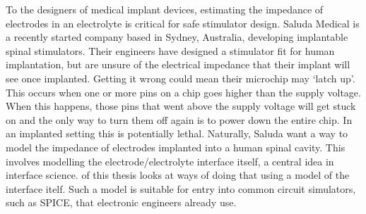   To the designers of medical implant devices, estimating the impedance of electrodes in an electrolyte is critical for safe stimulator design.
  Saluda Medical is a recently started company based in Sydney, Australia, developing implantable spinal stimulators.
  Their engineers have designed a stimulator fit for human implantation, but are unsure of the electrical impedance that their implant will see once implanted.
  Getting it wrong could mean their microchip may `latch up'.
  This occurs when one or more pins on a chip goes higher than the supply voltage.
  When this happens, those pins that went above the supply voltage will get stuck on and the only way to turn them off again is to power down the entire chip.
  In an implanted setting this is potentially lethal.
  Naturally, Saluda want a way to model the impedance of electrodes implanted into a human spinal cavity.
  This involves modelling the electrode/electrolyte interface itself, a central idea in interface science.
   of this thesis looks at ways of doing that using a model of the interface itelf.
  Such a model is suitable for entry into common circuit simulators, such as SPICE, that electronic engineers already use.
